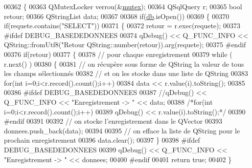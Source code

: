 \begin{DoxyCode}
00362 \{
00363     QMutexLocker verrou(&\hyperlink{class_base_de_donnees_aa1b4696fac87a740f914aa73739086f2}{mutex});
00364     QSqlQuery r;
00365     \textcolor{keywordtype}{bool} retour;
00366     QStringList data;
00367 
00368     \textcolor{keywordflow}{if}(\hyperlink{class_base_de_donnees_a3e738dcf443370c46a541677ab619f06}{db}.isOpen())
00369     \{
00370         \textcolor{keywordflow}{if}(requete.contains(\textcolor{stringliteral}{"SELECT"}))
00371         \{
00372             retour = r.exec(requete);
00373 \textcolor{preprocessor}{            #ifdef DEBUG\_BASEDEDONNEES}
00374             qDebug() << Q\_FUNC\_INFO << QString::fromUtf8(\textcolor{stringliteral}{"Retour %
      QString::number(retour)).arg(requete);
00375 \textcolor{preprocessor}{            #endif}
00376             \textcolor{keywordflow}{if}(retour)
00377             \{
00378                 \textcolor{comment}{// pour chaque enregistrement}
00379                 \textcolor{keywordflow}{while} ( r.next() )
00380                 \{
00381                     \textcolor{comment}{// on récupère sous forme de QString la valeur de tous les champs sélectionnés}
00382                     \textcolor{comment}{// et on les stocke dans une liste de QString}
00383                     \textcolor{keywordflow}{for}(\textcolor{keywordtype}{int} i=0;i<r.record().count();i++)
00384                         data << r.value(i).toString();
00385 
00386 \textcolor{preprocessor}{                    #ifdef DEBUG\_BASEDEDONNEES}
00387                     \textcolor{comment}{//qDebug() << Q\_FUNC\_INFO << "Enregistrement -> " << data;}
00388                     \textcolor{comment}{/*for(int i=0;i<r.record().count();i++)}
00389 \textcolor{comment}{                        qDebug() << r.value(i).toString();*/}
00390 \textcolor{preprocessor}{                    #endif}
00391 
00392                     \textcolor{comment}{// on stocke l'enregistrement dans le QVector}
00393                     donnees.push\_back(data);
00394 
00395                     \textcolor{comment}{// on efface la liste de QString pour le prochain enregistrement}
00396                     data.clear();
00397                 \}
00398 \textcolor{preprocessor}{                #ifdef DEBUG\_BASEDEDONNEES}
00399                 qDebug() << Q\_FUNC\_INFO << \textcolor{stringliteral}{"Enregistrement -> "} << donnees;
00400 \textcolor{preprocessor}{                #endif}
00401                 \textcolor{keywordflow}{return} \textcolor{keyword}{true};
00402             \}
}
\end{DoxyCode}
